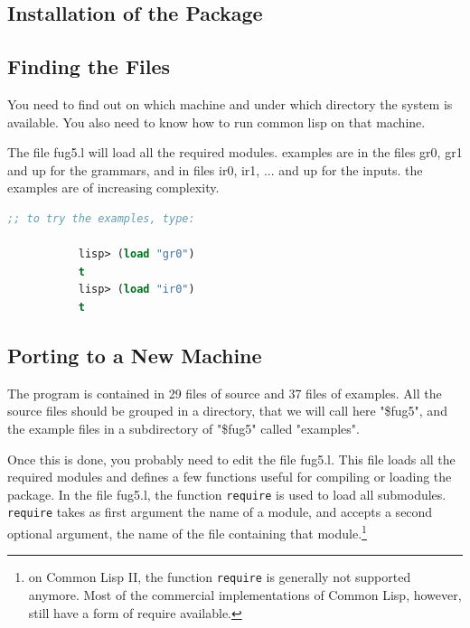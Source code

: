 \documentclass[10pt,a4paper]{report}
\begin{document}
\begin{appendices}

\chapter{Installation of the Package}
\label{installation}

\section{Finding the Files}

You need to find out on which machine and under which directory the
system is available. You also need to know how to run common lisp on
that machine.

The file fug5.l will load all the required modules.  examples are in the
files gr0, gr1 and up for the grammars, and in files ir0, ir1, ...
and up for the inputs. the examples are of increasing
complexity. 
 
 
 
 
 
 

\begin{lstlisting}[language=Lisp]
;; to try the examples, type:

           lisp> (load "gr0")
           t
           lisp> (load "ir0")
           t
\end{lstlisting}

\section{Porting to a New Machine}

The program is contained in 29 files of source and 37 files of
examples. All the source files should be grouped in a directory,
that we will call here "\$fug5", and the example files in a
subdirectory of "\$fug5" called "examples". 

Once this is done, you probably need to edit the file fug5.l.  This
file loads all the required modules and defines a few functions
useful for compiling or loading the package.
In the file fug5.l, the function {\tt require} is used to load all
submodules. {\tt require} takes as first argument the name of a
module, and accepts a second optional argument, the name of the
file containing that module.\footnote{on Common Lisp II, the function {\tt require}
is generally not supported anymore.  Most of the commercial implementations
of Common Lisp, however, still have a form of require available.}


\end{appendices}
\end{document}

